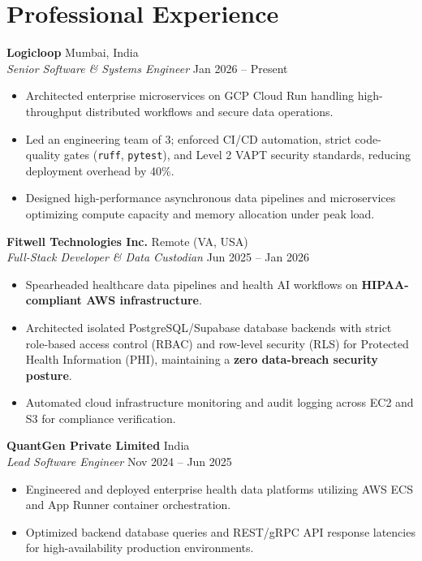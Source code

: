 \documentclass[10pt,letterpaper]{article}
\begin{document}
\section{Professional Experience}
\vspace{2pt}

\textbf{Logicloop} \hfill Mumbai, India \\
\textit{Senior Software \& Systems Engineer} \hfill \small{Jan 2026 -- Present}
\begin{itemize}[leftmargin=*, nosep]
    \item Architected enterprise microservices on GCP Cloud Run handling high-throughput distributed workflows and secure data operations.
    \item Led an engineering team of 3; enforced CI/CD automation, strict code-quality gates (\texttt{ruff}, \texttt{pytest}), and Level 2 VAPT security standards, reducing deployment overhead by 40\%.
    \item Designed high-performance asynchronous data pipelines and microservices optimizing compute capacity and memory allocation under peak load.
\end{itemize}
\vspace{2pt}

\textbf{Fitwell Technologies Inc.} \hfill Remote (VA, USA) \\
\textit{Full-Stack Developer \& Data Custodian} \hfill \small{Jun 2025 -- Jan 2026}
\begin{itemize}[leftmargin=*, nosep]
    \item Spearheaded healthcare data pipelines and health AI workflows on \textbf{HIPAA-compliant AWS infrastructure}.
    \item Architected isolated PostgreSQL/Supabase database backends with strict role-based access control (RBAC) and row-level security (RLS) for Protected Health Information (PHI), maintaining a \textbf{zero data-breach security posture}.
    \item Automated cloud infrastructure monitoring and audit logging across EC2 and S3 for compliance verification.
\end{itemize}
\vspace{2pt}

\textbf{QuantGen Private Limited} \hfill India \\
\textit{Lead Software Engineer} \hfill \small{Nov 2024 -- Jun 2025}
\begin{itemize}[leftmargin=*, nosep]
    \item Engineered and deployed enterprise health data platforms utilizing AWS ECS and App Runner container orchestration.
    \item Optimized backend database queries and REST/gRPC API response latencies for high-availability production environments.
\end{itemize}
\vspace{-4pt}
\end{document}

